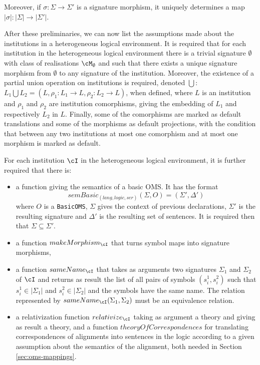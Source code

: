 \documentclass[10pt, a4paper]{isov2}
\newcommand*{\syntax}[1]{\texttt{#1}}
\begin{document}
Moreover, if $\sigma:\Sigma\to\Sigma'$ is a signature morphism,
it uniquely determines a map $|\sigma|:|\Sigma|\to|\Sigma'|$.

After these preliminaries, we can now list the assumptions made about the
institutions in a heterogeneous logical environment.
It is required that for each institution in the heterogeneous logical environment there is a trivial signature
$\emptyset$ with class of realisations $\cM_\emptyset$ and 
such that there exists a unique signature morphism
from $\emptyset$ to any signature of the institution. Moreover, the existence of a partial union operation on institutions is required, denoted $\bigcup$: 
$L_1 \bigcup L_2 = (L, \rho_1:L_1 \to L, \rho_2 : L_2 \to L)$, when defined, where
$L$ is an institution and $\rho_1$ and
$\rho_2$ are institution comorphisms, giving the embedding of $L_1$ and
respectively $L_2$ in $L$. Finally, some of the comorphisms are marked as default translations and some of the morphisms as default projections, with the condition that between any two institutions at most one comorphism and at most one morphism is marked as default.

For each institution $\cI$
in the heterogeneous logical environment, it is further required that
there is:
%
\begin{itemize}
  \item  a function giving the semantics of a basic OMS. It has the format
$$\mathit{semBasic}_{(lang,logic,ser)}(\Sigma,O) = (\Sigma',\Delta')$$
where $O$ is a \syntax{BasicOMS}, $\Sigma$ gives the context of previous declarations, $\Sigma'$ is the resulting
signature and $\Delta'$ is the resulting set of sentences.
 It is required then that $\Sigma\subseteq\Sigma'$.
  \item a function $makeMorphism_\cI$ that turns symbol maps into signature morphisms,
  \item a function $sameName_\cI$ that takes as arguments two signatures 
  $\Sigma_1$ and $\Sigma_2$ of $\cI$
  and returns as result the list of all pairs of symbols $(s^1_i,s^2_i)$ such that
  $s^1_i\in|\Sigma_1|$ and $s^2_i\in|\Sigma_2|$ and the symbols have the same name.
  The relation represented by $sameName_\cI(\Sigma_1,\Sigma_2)$ must be an
  equivalence relation.
  \item a relativization function $relativize_\cI$ 
  taking as argument a theory and giving as 
  result a theory, and a function
  $theoryOfCorrespondences$ for translating correspondences of alignments
  into sentences in the logic according to a given assumption about the
  semantics of the alignment, both needed in Section \ref{sec:oms-mappings}.
\end{itemize}
\end{document}
